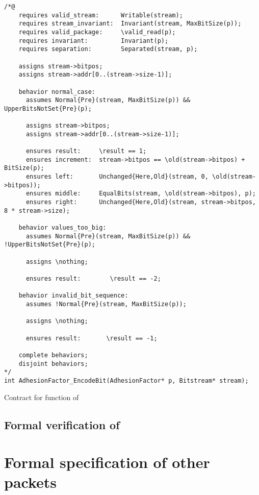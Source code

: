 \begin{listing}[hbt]
\begin{minipage}{0.99\textwidth}
\begin{lstlisting}[style=acsl-block]
/*@
    requires valid_stream:      Writable(stream);
    requires stream_invariant:  Invariant(stream, MaxBitSize(p));
    requires valid_package:     \valid_read(p);
    requires invariant:         Invariant(p);
    requires separation:        Separated(stream, p);

    assigns stream->bitpos;
    assigns stream->addr[0..(stream->size-1)];

    behavior normal_case:
      assumes Normal{Pre}(stream, MaxBitSize(p)) && UpperBitsNotSet{Pre}(p);

      assigns stream->bitpos;
      assigns stream->addr[0..(stream->size-1)];

      ensures result:     \result == 1;
      ensures increment:  stream->bitpos == \old(stream->bitpos) + BitSize(p);
      ensures left:       Unchanged{Here,Old}(stream, 0, \old(stream->bitpos));
      ensures middle:     EqualBits(stream, \old(stream->bitpos), p);
      ensures right:      Unchanged{Here,Old}(stream, stream->bitpos, 8 * stream->size);

    behavior values_too_big:
      assumes Normal{Pre}(stream, MaxBitSize(p)) && !UpperBitsNotSet{Pre}(p);

      assigns \nothing;

      ensures result:        \result == -2;

    behavior invalid_bit_sequence:
      assumes !Normal{Pre}(stream, MaxBitSize(p));

      assigns \nothing;

      ensures result:       \result == -1;

    complete behaviors;
    disjoint behaviors;
*/
int AdhesionFactor_EncodeBit(AdhesionFactor* p, Bitstream* stream);
\end{lstlisting}
\end{minipage}
\caption{\label{lst:adhesionfactor-encodebit}Contract for  function of }
\end{listing}

\FloatBarrier

\subsection{Formal verification of }

\section{Formal specification of other packets}
\label{sec:other packets}

